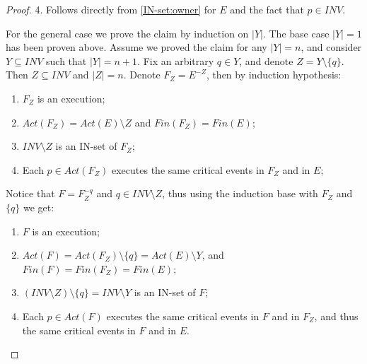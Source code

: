 \begin{proof}
	4. Follows directly from \ref{IN-set:owner} for $E$ and the fact that $p \in INV$.
	

	For the general case we prove the claim by induction on $|Y|$. The base case $|Y| = 1$ has been proven above. Assume we proved the claim for any $|Y|=n$, and consider $Y \subseteq INV$ such that $|Y| = n+1$. Fix an arbitrary $q \in Y$, and denote $Z = Y \setminus \{q\}$. Then $Z \subseteq INV$ and $|Z|=n$. Denote $F_Z = E^{-Z}$, then by induction hypothesis:
	\begin{enumerate}
		\item $F_Z$ is an execution;
		\item $Act(F_Z) = Act(E) \setminus Z$ and $Fin(F_Z) = Fin(E)$;
		\item $INV \setminus Z$ is an IN-set of $F_Z$;
		\item Each $p \in Act(F_Z)$ executes the same critical events in $F_Z$ and in $E$;
	\end{enumerate}
	Notice that $F = F_Z^{-q}$ and $q \in INV \setminus Z$, thus using the induction base with $F_Z$ and $\{q\}$ we get:
	\begin{enumerate}
		\item $F$ is an execution;
		\item $Act(F) = Act(F_Z) \setminus \{q\} = Act(E) \setminus Y$, and $Fin(F) = Fin(F_Z) = Fin(E)$;
		\item $(INV \setminus Z) \setminus \{q\} = INV \setminus Y$ is an IN-set of $F$;
		\item Each $p \in Act(F)$ executes the same critical events in $F$ and in $F_Z$, and thus the same critical events in $F$ and in $E$.
	\end{enumerate}
\end{proof}


